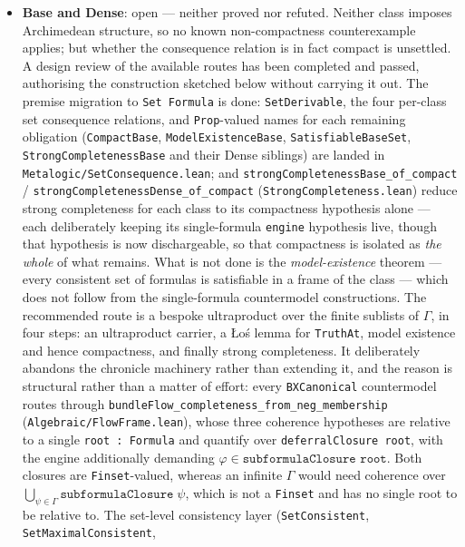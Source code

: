 \documentclass[../BimodalReference.tex]{subfiles}
\begin{document}
\begin{itemize}
  \item \textbf{Base and Dense}: open --- neither proved nor refuted.
    Neither class imposes Archimedean structure, so no known non-compactness counterexample
    applies; but whether the consequence relation is in fact compact is unsettled.
    A design review of the available routes has been completed and passed, authorising the
    construction sketched below without carrying it out.
    The premise migration to \texttt{Set Formula} is done: \texttt{SetDerivable}, the four per-class
    set consequence relations, and \texttt{Prop}-valued names for each remaining obligation
    (\texttt{CompactBase}, \texttt{ModelExistenceBase}, \texttt{SatisfiableBaseSet},
    \texttt{StrongCompletenessBase} and their Dense siblings) are landed in
    \texttt{Metalogic/SetConsequence.lean}; and
    \texttt{strongCompletenessBase\_of\_compact} / \texttt{strongCompletenessDense\_of\_compact}
    (\texttt{StrongCompleteness.lean}) reduce strong completeness for each class to its compactness
    hypothesis alone --- each deliberately keeping its single-formula \texttt{engine} hypothesis
    live, though that hypothesis is now dischargeable, so that compactness is isolated as
    \emph{the whole} of what remains.
    What is not done is the \emph{model-existence} theorem --- every consistent set of formulas is
    satisfiable in a frame of the class --- which does not follow from the single-formula
    countermodel constructions.
    The recommended route is a bespoke ultraproduct over the finite sublists of $\Gamma$, in four
    steps: an ultraproduct carrier, a \L{}o\'{s} lemma for \texttt{TruthAt}, model existence and
    hence compactness, and finally strong completeness.
    It deliberately abandons the chronicle machinery rather than extending it, and the reason is
    structural rather than a matter of effort: every \texttt{BXCanonical} countermodel routes
    through \texttt{bundleFlow\_completeness\_from\_neg\_membership}
    (\texttt{Algebraic/FlowFrame.lean}), whose three coherence hypotheses are
    relative to a single \texttt{root : Formula} and quantify over \texttt{deferralClosure root},
    with the engine additionally demanding $\varphi \in \texttt{subformulaClosure root}$.
    Both closures are \texttt{Finset}-valued, whereas an infinite $\Gamma$ would need coherence over
    $\bigcup_{\psi \in \Gamma} \texttt{subformulaClosure}\;\psi$, which is not a \texttt{Finset} and
    has no single root to be relative to.
    The set-level consistency layer (\texttt{SetConsistent}, \texttt{SetMaximalConsistent},

\end{itemize}
\end{document}
